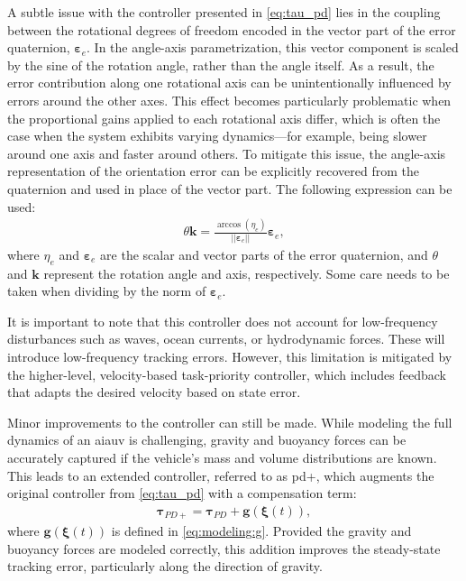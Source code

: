 A subtle issue with the controller presented in \autoref{eq:tau_pd} lies in the coupling between the rotational degrees of freedom encoded in the vector part of the error quaternion, $\bm{\varepsilon}_e$. In the angle-axis parametrization, this vector component is scaled by the sine of the rotation angle, rather than the angle itself. As a result, the error contribution along one rotational axis can be unintentionally influenced by errors around the other axes. This effect becomes particularly problematic when the proportional gains applied to each rotational axis differ, which is often the case when the system exhibits varying dynamics—for example, being slower around one axis and faster around others. To mitigate this issue, the angle-axis representation of the orientation error can be explicitly recovered from the quaternion and used in place of the vector part. The following expression can be used:
\begin{align}
\theta \bm{k} = \frac{\arccos(\eta_e)}{||\bm{\varepsilon}_e||} \bm{\varepsilon}_e,
\end{align}
where \({\eta}_e\) and \(\bm{{\varepsilon}}_e\) are the scalar and vector parts of the error quaternion, and $\theta$ and $\bm{k}$ represent the rotation angle and axis, respectively. Some care needs to be taken when dividing by the norm of \(\bm{\varepsilon}_e\).

It is important to note that this controller does not account for low-frequency disturbances such as waves, ocean currents, or hydrodynamic forces. These will introduce low-frequency tracking errors. However, this limitation is mitigated by the higher-level, velocity-based task-priority controller, which includes feedback that adapts the desired velocity based on state error.

Minor improvements to the controller can still be made. While modeling the full dynamics of an \gls{aiauv} is challenging, gravity and buoyancy forces can be accurately captured if the vehicle’s mass and volume distributions are known. This leads to an extended controller, referred to as \gls{pd}+, which augments the original controller from \autoref{eq:tau_pd} with a compensation term:
\begin{align}
    \label{eq:tpc:pd_plus}
    \bm{\tau}_{PD+} = \bm{\tau}_{PD} + \bm{g}(\bm{\xi}(t)),
\end{align}
where \(\bm{g}(\bm{\xi}(t))\) is defined in \autoref{eq:modeling:g}. Provided the gravity and buoyancy forces are modeled correctly, this addition improves the steady-state tracking error, particularly along the direction of gravity.

